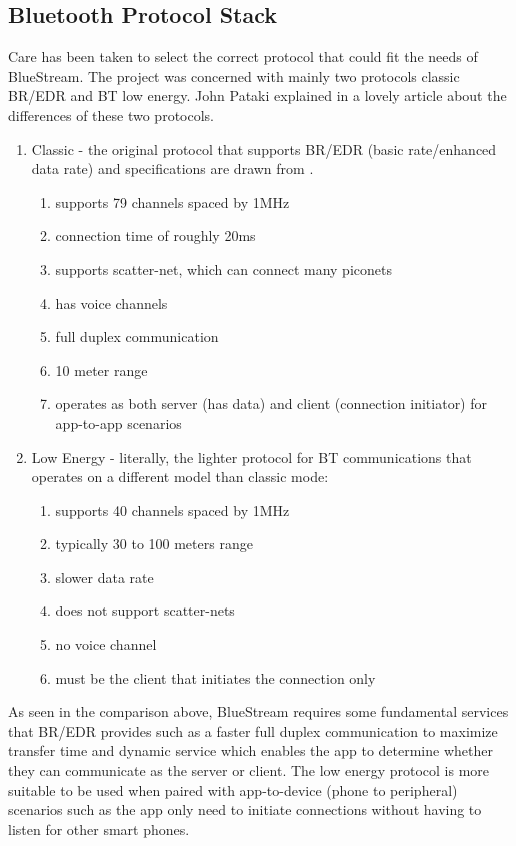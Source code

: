 \documentclass[a4paper,12pt]{article}
\begin{document}
\subsection{Bluetooth Protocol Stack}
Care has been taken to select the correct protocol that could fit the needs of BlueStream. The project was concerned with mainly two protocols classic BR/EDR and BT low energy. John Pataki explained in a lovely article \cite{UnderstandingBTForAndroid} about the differences of these two protocols. 

\begin{enumerate}

\item Classic - the original protocol that supports BR/EDR (basic rate/enhanced data rate) and specifications are drawn from \cite{InsideBlueTooth}. 

    \begin{enumerate}
    \item supports 79 channels spaced by 1MHz 
    \item connection time of roughly 20ms
    \item supports scatter-net, which can connect many piconets
    \item has voice channels 
    \item full duplex communication
    \item 10 meter range
    \item operates as both server (has data) and client (connection initiator) for    app-to-app scenarios
    \end{enumerate}
\item Low Energy - literally, the lighter protocol for BT communications that operates on a different model than classic mode:
    \begin{enumerate}
    \item supports 40 channels spaced by 1MHz
    \item typically 30 to 100 meters range
    \item slower data rate
    \item does not support scatter-nets
    \item no voice channel
    \item must be the client that initiates the connection only
    \end{enumerate}
\end{enumerate}

As seen in the comparison above, BlueStream requires some fundamental services that BR/EDR provides such as a faster full duplex communication to maximize transfer time and dynamic service which enables the app to determine whether they can communicate as the server or client. The low energy protocol is more suitable to be used when paired with app-to-device (phone to peripheral) scenarios such as the app only need to initiate connections without having to listen for other smart phones\cite{UnderstandingBTForAndroid}. 
\end{document}
